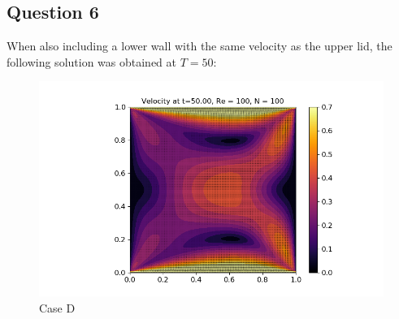 \documentclass[10pt]{report}
\begin{document}
\subsection*{Question 6}
When also including a lower wall with the same velocity as the upper lid, the following solution was
obtained at $T= 50$:
\begin{figure}[H]
    \centering
    \includegraphics[width = \textwidth]{plots/velocity_D1.png}
    \caption{Case D}
    \label{caseD1}
\end{figure}
\end{document}
